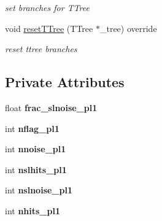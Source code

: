 \begin{DoxyCompactItemize}
\begin{DoxyCompactList}\small\item\em set branches for T\-Tree \end{DoxyCompactList}\item 
\hypertarget{classanalysis_1_1PMTNoise_a62da6c7527b9e7364d381b860937f3af}{void \hyperlink{classanalysis_1_1PMTNoise_a62da6c7527b9e7364d381b860937f3af}{reset\-T\-Tree} (T\-Tree $\ast$\-\_\-tree) override}\label{classanalysis_1_1PMTNoise_a62da6c7527b9e7364d381b860937f3af}

\begin{DoxyCompactList}\small\item\em reset ttree branches \end{DoxyCompactList}\end{DoxyCompactItemize}
\subsection*{Private Attributes}
\begin{DoxyCompactItemize}
\item 
\hypertarget{classanalysis_1_1PMTNoise_abfcea00205eb7f7920ff05aad6e4a38e}{float {\bfseries frac\-\_\-slnoise\-\_\-pl1}}\label{classanalysis_1_1PMTNoise_abfcea00205eb7f7920ff05aad6e4a38e}

\item 
\hypertarget{classanalysis_1_1PMTNoise_a9bdfa7a3c4ce11254d360cd986b15d9d}{int {\bfseries nflag\-\_\-pl1}}\label{classanalysis_1_1PMTNoise_a9bdfa7a3c4ce11254d360cd986b15d9d}

\item 
\hypertarget{classanalysis_1_1PMTNoise_afb7060750a3706698327c674dc74dc25}{int {\bfseries nnoise\-\_\-pl1}}\label{classanalysis_1_1PMTNoise_afb7060750a3706698327c674dc74dc25}

\item 
\hypertarget{classanalysis_1_1PMTNoise_ad0f9abc978569f8c1b5cb1df6b55f5f7}{int {\bfseries nslhits\-\_\-pl1}}\label{classanalysis_1_1PMTNoise_ad0f9abc978569f8c1b5cb1df6b55f5f7}

\item 
\hypertarget{classanalysis_1_1PMTNoise_a7392a852a973022c0cd04e3acf49ead7}{int {\bfseries nslnoise\-\_\-pl1}}\label{classanalysis_1_1PMTNoise_a7392a852a973022c0cd04e3acf49ead7}

\item 
\hypertarget{classanalysis_1_1PMTNoise_a55a48b14096d97c8232f698902c92a3f}{int {\bfseries nhits\-\_\-pl1}}\label{classanalysis_1_1PMTNoise_a55a48b14096d97c8232f698902c92a3f}

\end{DoxyCompactItemize}


